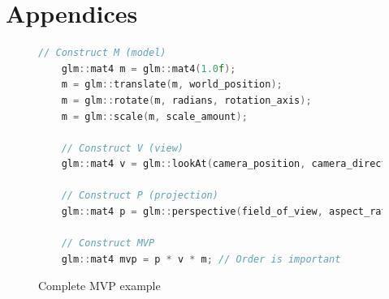 \documentclass[11pt]{article}
\begin{document}
\clearpage
\printnoidxglossary[type=\acronymtype]

\clearpage




\section{Appendices}
\begin{figure}[ht]
  \centering
  \begin{lstlisting}[language=C++]
    // Construct M (model)
    glm::mat4 m = glm::mat4(1.0f);
    m = glm::translate(m, world_position);   
    m = glm::rotate(m, radians, rotation_axis); 
    m = glm::scale(m, scale_amount);

    // Construct V (view)
    glm::mat4 v = glm::lookAt(camera_position, camera_direction, camera_up);

    // Construct P (projection)
    glm::mat4 p = glm::perspective(field_of_view, aspect_ratio, near, far);

    // Construct MVP
    glm::mat4 mvp = p * v * m; // Order is important

  \end{lstlisting}
  \caption{Complete MVP example}
  \label{fig:local_to_world_appendix}
\end{figure}
\end{document}
